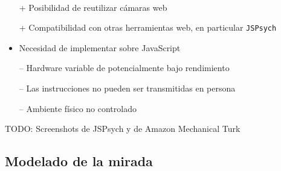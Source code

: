 \documentclass[aspectratio=169]{beamer}
\begin{document}
\begin{frame}{~}

  \begin{itemize}
    \item[+] Posibilidad de reutilizar cámaras web

    \item[+] Compatibilidad con otras herramientas web, en particular
      \texttt{JSPsych}

    \item Necesidad de implementar sobre JavaScript

    \item[--] Hardware variable de potencialmente bajo rendimiento

    \item[--] Las instrucciones no pueden ser transmitidas en persona

    \item[--] Ambiente físico no controlado
  \end{itemize}

  TODO: Screenshots de JSPsych y de Amazon Mechanical Turk

\end{frame}

\subsection{Modelado de la mirada}
\end{document}

